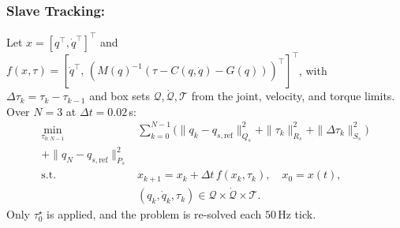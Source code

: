 \documentclass[a4paper, 10pt, conference]{ieeeconf}      %
\begin{document}
\subsubsection{Slave Tracking:}
Let $x=[q^{\top},\dot q^{\top}]^{\top}$ and
$f(x,\tau)=[\dot q^{\top},\,(M(q)^{-1}(\tau-C(q,\dot q)-G(q)))^{\top}]^{\top}$,
with $\Delta\tau_k=\tau_k-\tau_{k-1}$ and box sets
$\mathcal{Q},\dot{\mathcal{Q}},\mathcal{T}$ from the joint, velocity, and torque
limits. Over $N=3$ at $\Delta t=0.02$\,s:
\begin{equation}
\begin{aligned}
\min_{\tau_{0:N-1}}\;
&\sum_{k=0}^{N-1}\!\big(\|q_k-q_{s,\mathrm{ref}}\|_{Q_s}^{2}
+\|\tau_k\|_{R_s}^{2}+\|\Delta\tau_k\|_{S_s}^{2}\big)\\
+\|q_N-q_{s,\mathrm{ref}}\|_{P_s}^{2}\\
\text{s.t.}\;
&x_{k+1}=x_k+\Delta t\,f(x_k,\tau_k),\quad x_0=x(t),\\
&(q_k,\dot q_k,\tau_k)\in\mathcal{Q}\times\dot{\mathcal{Q}}\times\mathcal{T}.
\end{aligned}
\label{eq:slave_mpc}
\end{equation}
Only $\tau_0^{\star}$ is applied, and the problem is re-solved each $50$\,Hz tick.

        
\end{document}
